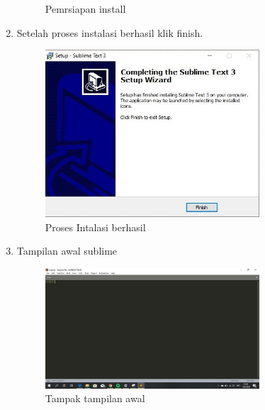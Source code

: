 \begin{enumerate}
\begin{figure}[H]
		\centering
		\caption{Pemrsiapan install}
	\end{figure}
\item Setelah proses instalasi berhasil klik finish.
	\begin{figure}[H]
		\includegraphics[width=8cm]{figures/instalasi/sb7.jpg}
		\centering
		\caption{Proses Intalasi berhasil}
	\end{figure}
\item Tampilan awal sublime
	\begin{figure}[H]
		\includegraphics[width=8cm]{figures/instalasi/sb8.jpg}
		\centering
		\caption{Tampak tampilan awal}
	\end{figure}
\end{enumerate}

